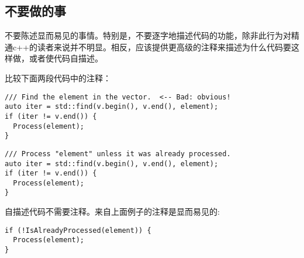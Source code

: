 \subsection{不要做的事}
不要陈述显而易见的事情。特别是，不要逐字地描述代码的功能，除非此行为对精通c++的读者来说并不明显。相反，应该提供更高级的注释来描述为什么代码要这样做，或者使代码自描述。

比较下面两段代码中的注释：
\begin{verbatim}
/// Find the element in the vector.  <-- Bad: obvious!
auto iter = std::find(v.begin(), v.end(), element);
if (iter != v.end()) {
  Process(element);
}
\end{verbatim}
\begin{verbatim}
/// Process "element" unless it was already processed.
auto iter = std::find(v.begin(), v.end(), element);
if (iter != v.end()) {
  Process(element);
}
\end{verbatim}
自描述代码不需要注释。来自上面例子的注释是显而易见的:
\begin{verbatim}
if (!IsAlreadyProcessed(element)) {
  Process(element);
}
\end{verbatim}